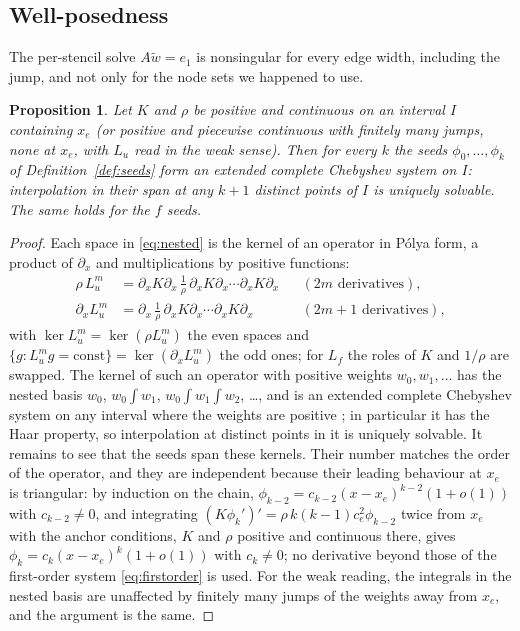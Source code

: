 \documentclass[11pt]{amsart}
\newtheorem{proposition}[theorem]{Proposition}
\theoremstyle{definition}
\theoremstyle{remark}
\newcommand{\Lu}{L_u}
\newcommand{\Lf}{L_f}
\newcommand{\px}{\partial_x}
\begin{document}
\subsection{Well-posedness}
\label{sec:ect}
The per-stencil solve $A \tilde w = e_1$ is nonsingular for every edge
width, including the jump, and not only for the node sets we happened to
use.

\begin{proposition}
\label{prop:ect}
Let $K$ and $\rho$ be positive and continuous on an interval $I$
containing $x_e$ (or positive and piecewise continuous with finitely
many jumps, none at $x_e$, with $\Lu$ read in the weak sense). Then for every $k$ the seeds $\phi_0, \ldots,
\phi_k$ of Definition~\ref{def:seeds} form an extended complete
Chebyshev system on $I$: interpolation in their span at any $k + 1$
distinct points of $I$ is uniquely solvable. The same holds for the $f$
seeds.
\end{proposition}

\begin{proof}
Each space in \eqref{eq:nested} is the kernel of an operator in P\'olya
form, a product of $\px$ and multiplications by positive functions:
\begin{equation}
  \label{eq:polya}
  \begin{aligned}
  \rho\, \Lu^m &= \px K \px\, \tfrac{1}{\rho}\, \px K \px \cdots \px K \px
  &&(2m \text{ derivatives}), \\
  \px \Lu^m &= \px\, \tfrac{1}{\rho}\, \px K \px \cdots \px K \px
  &&(2m + 1 \text{ derivatives}),
  \end{aligned}
\end{equation}
with $\ker \Lu^m = \ker (\rho \Lu^m)$ the even spaces and $\{ g :
\Lu^m g = \mathrm{const} \} = \ker (\px \Lu^m)$ the odd ones; for $\Lf$
the roles of $K$ and $1 / \rho$ are swapped. The kernel of such an
operator with positive weights $w_0, w_1, \ldots$ has the nested basis
$w_0$, $w_0 \int w_1$, $w_0 \int w_1 \int w_2$, \ldots, and is an
extended complete Chebyshev system on any interval where the weights are
positive \cite{Polya1922,KarlinStudden1966,Coppel1971}; in particular it
has the Haar property, so interpolation at distinct points in it is
uniquely solvable. It remains to see that the seeds span these kernels.
Their number matches the order of the operator, and they are
independent because their leading behaviour at $x_e$ is triangular: by
induction on the chain, $\phi_{k-2} = c_{k-2} (x - x_e)^{k-2} (1 + o(1))$
with $c_{k-2} \ne 0$, and integrating $(K \phi_k')' = \rho\, k (k - 1)
c_e^2 \phi_{k-2}$ twice from $x_e$ with the anchor conditions, $K$ and
$\rho$ positive and continuous there, gives $\phi_k = c_k (x - x_e)^k
(1 + o(1))$ with $c_k \ne 0$; no derivative beyond those of the
first-order system \eqref{eq:firstorder} is used. For the weak reading,
the integrals in the nested basis are unaffected by finitely many jumps
of the weights away from $x_e$, and the argument is the same.
\end{proof}
\end{document}
